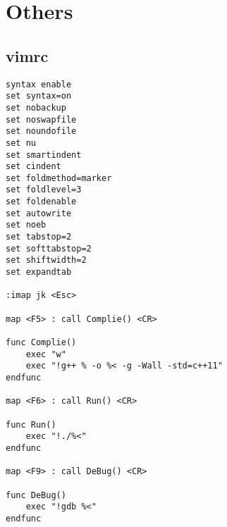 \documentclass[twoside]{article}
\begin{document}
\section{Others}

\subsection{vimrc}
\begin{lstlisting}
syntax enable
set syntax=on
set nobackup
set noswapfile
set noundofile
set nu
set smartindent
set cindent
set foldmethod=marker
set foldlevel=3 
set foldenable
set autowrite
set noeb
set tabstop=2
set softtabstop=2
set shiftwidth=2
set expandtab 

:imap jk <Esc>

map <F5> : call Complie() <CR>

func Complie()
	exec "w"
	exec "!g++ % -o %< -g -Wall -std=c++11"
endfunc

map <F6> : call Run() <CR>

func Run()
	exec "!./%<"
endfunc

map <F9> : call DeBug() <CR>

func DeBug()
	exec "!gdb %<"
endfunc

\end{lstlisting}
\end{document}
